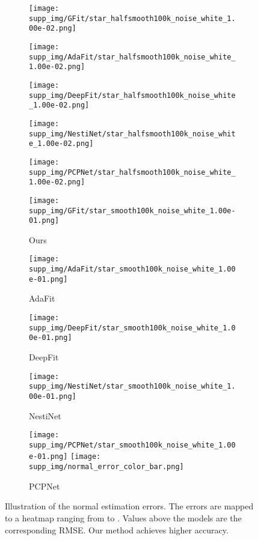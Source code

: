 \documentclass[runningheads]{llncs}
\begin{document}
\begin{figure*}
\begin{subfigure}{0.15\linewidth}
		\centering
		\texttt{[image: supp\_img/GFit/star\_halfsmooth100k\_noise\_white\_1.00e-02.png]}
\end{subfigure}
	\hspace{0.1cm}
	\begin{subfigure}{0.15\linewidth}
		\centering
		\texttt{[image: supp\_img/AdaFit/star\_halfsmooth100k\_noise\_white\_1.00e-02.png]}
\end{subfigure}
	\hspace{0.1cm}
	\begin{subfigure}{0.17\linewidth}
		\centering
		\texttt{[image: supp\_img/DeepFit/star\_halfsmooth100k\_noise\_white\_1.00e-02.png]}
\end{subfigure}
	\hspace{0.1cm}
	\begin{subfigure}{0.17\linewidth}
		\centering
		\texttt{[image: supp\_img/NestiNet/star\_halfsmooth100k\_noise\_white\_1.00e-02.png]}
\end{subfigure}
	\hspace{0.1cm}
	\begin{subfigure}{0.17\linewidth}
		\centering
		\texttt{[image: supp\_img/PCPNet/star\_halfsmooth100k\_noise\_white\_1.00e-02.png]}
\end{subfigure}
	
\begin{subfigure}{0.15\linewidth}
		\centering
		\texttt{[image: supp\_img/GFit/star\_smooth100k\_noise\_white\_1.00e-01.png]}
		\caption{Ours}
	\end{subfigure}
	\hspace{0.1cm}
	\begin{subfigure}{0.15\linewidth}
		\centering
		\texttt{[image: supp\_img/AdaFit/star\_smooth100k\_noise\_white\_1.00e-01.png]}
		\caption{AdaFit}
	\end{subfigure}
	\hspace{0.1cm}
	\begin{subfigure}{0.17\linewidth}
		\centering
		\texttt{[image: supp\_img/DeepFit/star\_smooth100k\_noise\_white\_1.00e-01.png]}
		\caption{DeepFit}
	\end{subfigure}
	\hspace{0.1cm}
	\begin{subfigure}{0.17\linewidth}
		\centering
		\texttt{[image: supp\_img/NestiNet/star\_smooth100k\_noise\_white\_1.00e-01.png]}
		\caption{NestiNet}
	\end{subfigure}
	\hspace{0.1cm}
	\begin{subfigure}{0.17\linewidth}
		\centering
		\texttt{[image: supp\_img/PCPNet/star\_smooth100k\_noise\_white\_1.00e-01.png]}
		\hspace{0.3cm}
		\texttt{[image: supp\_img/normal\_error\_color\_bar.png]}
		\caption{PCPNet}
	\end{subfigure}
\caption{Illustration of the normal estimation errors.
		The errors are mapped to a heatmap ranging from  to . Values above the models are the corresponding RMSE. Our method achieves higher accuracy.
	}
	\label{fig:quali3}
\end{figure*}
\end{document}
